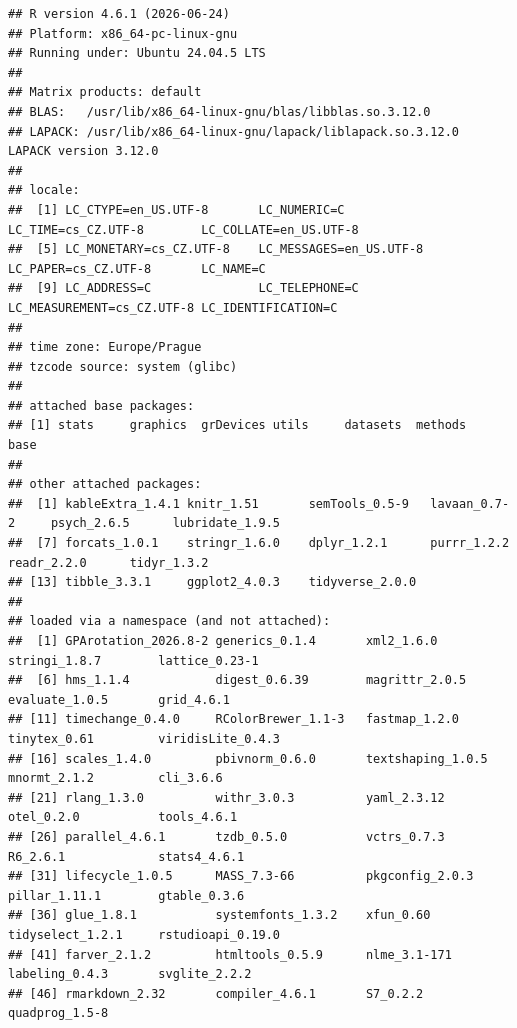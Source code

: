 \documentclass[
  10pt,
]{article}
\begin{document}
\begin{verbatim}
## R version 4.6.1 (2026-06-24)
## Platform: x86_64-pc-linux-gnu
## Running under: Ubuntu 24.04.5 LTS
##
## Matrix products: default
## BLAS:   /usr/lib/x86_64-linux-gnu/blas/libblas.so.3.12.0
## LAPACK: /usr/lib/x86_64-linux-gnu/lapack/liblapack.so.3.12.0  LAPACK version 3.12.0
##
## locale:
##  [1] LC_CTYPE=en_US.UTF-8       LC_NUMERIC=C               LC_TIME=cs_CZ.UTF-8        LC_COLLATE=en_US.UTF-8
##  [5] LC_MONETARY=cs_CZ.UTF-8    LC_MESSAGES=en_US.UTF-8    LC_PAPER=cs_CZ.UTF-8       LC_NAME=C
##  [9] LC_ADDRESS=C               LC_TELEPHONE=C             LC_MEASUREMENT=cs_CZ.UTF-8 LC_IDENTIFICATION=C
##
## time zone: Europe/Prague
## tzcode source: system (glibc)
##
## attached base packages:
## [1] stats     graphics  grDevices utils     datasets  methods   base
##
## other attached packages:
##  [1] kableExtra_1.4.1 knitr_1.51       semTools_0.5-9   lavaan_0.7-2     psych_2.6.5      lubridate_1.9.5
##  [7] forcats_1.0.1    stringr_1.6.0    dplyr_1.2.1      purrr_1.2.2      readr_2.2.0      tidyr_1.3.2
## [13] tibble_3.3.1     ggplot2_4.0.3    tidyverse_2.0.0
##
## loaded via a namespace (and not attached):
##  [1] GPArotation_2026.8-2 generics_0.1.4       xml2_1.6.0           stringi_1.8.7        lattice_0.23-1
##  [6] hms_1.1.4            digest_0.6.39        magrittr_2.0.5       evaluate_1.0.5       grid_4.6.1
## [11] timechange_0.4.0     RColorBrewer_1.1-3   fastmap_1.2.0        tinytex_0.61         viridisLite_0.4.3
## [16] scales_1.4.0         pbivnorm_0.6.0       textshaping_1.0.5    mnormt_2.1.2         cli_3.6.6
## [21] rlang_1.3.0          withr_3.0.3          yaml_2.3.12          otel_0.2.0           tools_4.6.1
## [26] parallel_4.6.1       tzdb_0.5.0           vctrs_0.7.3          R6_2.6.1             stats4_4.6.1
## [31] lifecycle_1.0.5      MASS_7.3-66          pkgconfig_2.0.3      pillar_1.11.1        gtable_0.3.6
## [36] glue_1.8.1           systemfonts_1.3.2    xfun_0.60            tidyselect_1.2.1     rstudioapi_0.19.0
## [41] farver_2.1.2         htmltools_0.5.9      nlme_3.1-171         labeling_0.4.3       svglite_2.2.2
## [46] rmarkdown_2.32       compiler_4.6.1       S7_0.2.2             quadprog_1.5-8
\end{verbatim}
\end{document}
